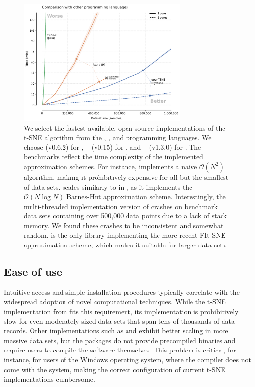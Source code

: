 \documentclass[article]{jss}
\newcommand{\opentsne}{\pkg{openTSNE}\xspace}
\begin{document}
\begin{figure}[ht]
  \centering
  \includegraphics[width=0.75\textwidth]{benchmarks_langs-final}
  \caption{\label{fig:benchmarks_lang}
  We select the fastest available, open-source implementations of the t-SNE algorithm from the , , and  programming languages. We choose \opentsne (v0.6.2) for , ~\citep{krijthe2015rtsne} (v0.15) for , and ~\citep{julia_tsne} (v1.3.0) for . The benchmarks reflect the time complexity of the implemented approximation schemes. For instance,  implements a naive $\mathcal{O}(N^2)$ algorithm, making it prohibitively expensive for all but the smallest of data sets.  scales similarly to  in , as it implements the $\mathcal{O}(N \log N)$ Barnes-Hut approximation scheme. Interestingly, the multi-threaded implementation version of  crashes on benchmark data sets containing over 500,000 data points due to a lack of stack memory. We found these crashes to be inconsistent and somewhat random. \opentsne is the only library implementing the more recent FIt-SNE approximation scheme, which makes it suitable for larger data sets. }
\end{figure}

\subsection{Ease of use}

Intuitive access and simple installation procedures typically correlate with the widespread adoption of novel computational techniques. While the t-SNE implementation from  fits this requirement, its implementation is prohibitively slow for even moderately-sized data sets that span tens of thousands of data records. Other  implementations such as  and  exhibit better scaling in more massive data sets, but the packages do not provide precompiled binaries and require users to compile the software themselves. This problem is critical, for instance, for users of the Windows operating system, where the  compiler does not come with the system, making the correct configuration of current t-SNE implementations cumbersome.
\end{document}
